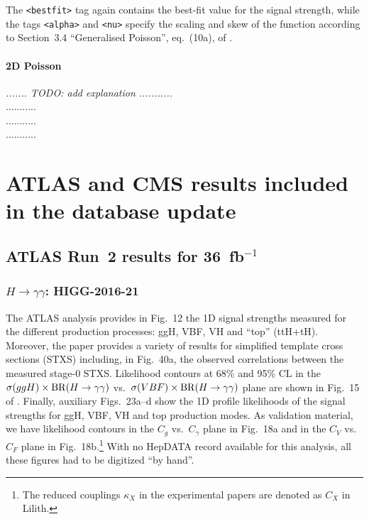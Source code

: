 \documentclass[submission, Phys]{SciPost}
\begin{document}
\noindent 
The {\tt <bestfit>} tag again contains the best-fit value for the signal strength, 
while the tags {\tt <alpha>} and {\tt <nu>} specify the scaling and skew of the function 
according to Section~3.4 ``Generalised Poisson'', eq.~(10a), of \cite{Barlow:2004wg}. 


\paragraph{2D Poisson}   
 
 {\em ....... TODO: add explanation ...........}\\
...........\\
...........\\
...........\\




\section{ATLAS and CMS results included in the database update}

\subsection{ATLAS Run~2 results for 36~fb$^{-1}$}

\subsubsection*{\boldmath $H\to\gamma\gamma$: HIGG-2016-21}

The ATLAS analysis \cite{Aaboud:2018xdt} provides in Fig.~12 the 1D signal strengths measured for the different production processes:  
ggH, VBF, VH and ``top'' (ttH+tH). Moreover, the paper provides a variety of results for simplified template cross sections (STXS) 
including, in Fig.~40a, the observed correlations between the measured stage-0 STXS. 
Likelihood contours at 68\% and 95\% CL in the $\sigma(ggH)\times {\rm BR}(H\to\gamma\gamma)$ vs.\ 
$\sigma(VBF)\times {\rm BR}(H\to\gamma\gamma)$ plane are shown in Fig.~15 of \cite{Aaboud:2018xdt}. 
Finally, auxiliary Figs.~23a--d show the 1D profile likelihoods of the signal strengths for ggH, VBF, VH and top production modes.
As validation material, we have likelihood contours in the $C_g$ vs.\ $C_\gamma$ plane in Fig.~18a and in the $C_V$ vs.\ $C_F$ plane in Fig.~18b.\footnote{The reduced couplings $\kappa_X$ in the experimental papers are denoted as $C_X$ in Lilith.}
With no HepDATA record available for this analysis, all these figures had to be digitized ``by hand''.
\end{document}
